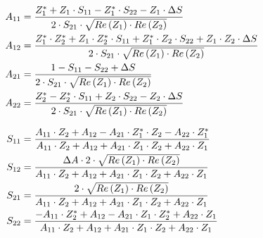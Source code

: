 \documentclass[10pt]{report}
\begin{document}
\begin{align}
A_{11} &= \dfrac{Z_{1}^{*} + Z_{1}\cdot S_{11} - Z_{1}^{*}\cdot S_{22} - Z_{1}\cdot \Delta S}{2\cdot S_{21}\cdot \sqrt{Re\left(Z_{1}\right)\cdot Re\left(Z_{2}\right)}}\\
A_{12} &= \dfrac{Z_{1}^{*}\cdot Z_{2}^{*} + Z_{1}\cdot Z_{2}^{*}\cdot S_{11} + Z_{1}^{*}\cdot Z_{2}\cdot S_{22} + Z_{1}\cdot Z_{2}\cdot \Delta S}{2\cdot S_{21}\cdot \sqrt{Re\left(Z_{1}\right)\cdot Re\left(Z_{2}\right)}}\\
A_{21} &= \dfrac{1 - S_{11} - S_{22} + \Delta S}{2\cdot S_{21}\cdot \sqrt{Re\left(Z_{1}\right)\cdot Re\left(Z_{2}\right)}}\\
A_{22} &= \dfrac{Z_{2}^{*} - Z_{2}^{*}\cdot S_{11} + Z_{2}\cdot S_{22} - Z_{2}\cdot \Delta S}{2\cdot S_{21}\cdot \sqrt{Re\left(Z_{1}\right)\cdot Re\left(Z_{2}\right)}}\\
\intertext{
}
S_{11} &= \dfrac{A_{11}\cdot Z_{2} + A_{12} - A_{21}\cdot Z_{1}^{*}\cdot Z_{2} - A_{22}\cdot Z_{1}^{*}}{A_{11}\cdot Z_{2} + A_{12} + A_{21}\cdot Z_{1}\cdot Z_{2} + A_{22}\cdot Z_{1}}\\
S_{12} &= \dfrac{\Delta A\cdot 2\cdot \sqrt{Re\left(Z_{1}\right)\cdot Re\left(Z_{2}\right)}}{A_{11}\cdot Z_{2} + A_{12} + A_{21}\cdot Z_{1}\cdot Z_{2} + A_{22}\cdot Z_{1}}\\
S_{21} &= \dfrac{2\cdot \sqrt{Re\left(Z_{1}\right)\cdot Re\left(Z_{2}\right)}}{A_{11}\cdot Z_{2} + A_{12} + A_{21}\cdot Z_{1}\cdot Z_{2} + A_{22}\cdot Z_{1}}\\
S_{22} &= \dfrac{-A_{11}\cdot Z_{2}^{*} + A_{12} - A_{21}\cdot Z_{1}\cdot Z_{2}^{*} + A_{22}\cdot Z_{1}}{A_{11}\cdot Z_{2} + A_{12} + A_{21}\cdot Z_{1}\cdot Z_{2} + A_{22}\cdot Z_{1}}
\end{align}
\end{document}
